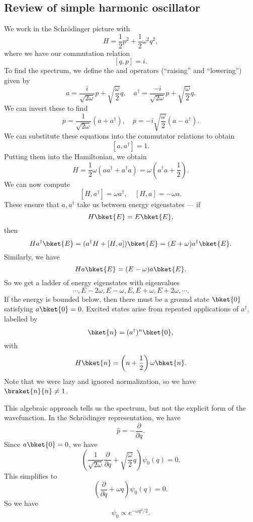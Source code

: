 \documentclass[a4paper]{article}
\begin{document}
\subsection{Review of simple harmonic oscillator}
We work in the Schr\"odinger picture with
\[
  H = \frac{1}{2}p^2 + \frac{1}{2} \omega^2 q^2,
\]
where we have our commutation relation
\[
  [q, p] = i.
\]
To find the spectrum, we define the  and  operators (``raising'' and ``lowering'') given by
\[
  a = \frac{i}{\sqrt{2 \omega}}p + \sqrt{\frac{\omega}{2}}q,\quad a^\dagger = \frac{-i}{\sqrt{2\omega}}p + \sqrt{\frac{\omega}{2}}q.
\]
We can invert these to find
\[
  p = \frac{1}{\sqrt{2\omega}}(a + a^\dagger),\quad p = -i\sqrt{\frac{\omega}{2}} (a - a^\dagger).
\]
We can substitute these equations into the commutator relations to obtain
\[
  [a, a^\dagger] = 1.
\]
Putting them into the Hamiltonian, we obtain
\[
  H = \frac{1}{2}\omega(a a^\dagger + a^\dagger a) = \omega \left(a^\dagger a + \frac{1}{2}\right).
\]
We can now compute
\[
  [H, a^\dagger] = \omega a^\dagger,\quad [H, a] = -\omega a.
\]
These ensure that $a, a^\dagger$ take us between energy eigenstates --- if
\[
  H\bket{E} = E \bket{E},
\]
then
\[
  Ha^\dagger\bket{E} = (a^\dagger H + [H, a]) \bket{E} = (E + \omega)a^\dagger \bket{E}.
\]
Similarly, we have
\[
  Ha\bket{E} = (E - \omega)a\bket{E}.
\]
So we get a ladder of energy eigenstates with eigenvalues
\[
  \cdots, E - 2\omega, E - \omega, E, E + \omega, E + 2\omega, \cdots.
\]
If the energy is bounded below, then there must be a ground state $\bket{0}$ satisfying $a \bket{0} = 0$. Excited states arise from repeated applications of $a^\dagger$, labelled by
\[
  \bket{n} = (a^\dagger)^n \bket{0},
\]
with
\[
  H\bket{n} = \left(n + \frac{1}{2}\right)\omega \bket{n}.
\]
Note that we were lazy and ignored normalization, so we have $\braket{n}{n} \not= 1$.

This algebraic approach tells us the spectrum, but not the explicit form of the wavefunction. In the Schr\"odinger representation, we have
\[
  \hat{p} = -\frac{\partial}{\partial q}.
\]
Since $a \bket{0} = 0$, we have
\[
  \left(\frac{1}{\sqrt{2\omega}}\frac{\partial}{\partial q} + \sqrt{\frac{\omega}{2}} q\right)\psi_0(q) = 0.
\]
This simplifies to
\[
  \left(\frac{\partial}{\partial q} + \omega q\right) \psi_0(q) = 0.
\]
So we have
\[
  \psi_0 \propto e^{-\omega q^2/2}.
\]
\end{document}
